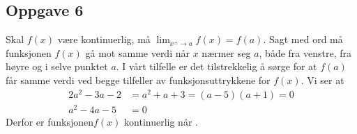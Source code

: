 \subsection*{Oppgave 6}
Skal $ f(x) $ være kontinuerlig, må $\lim_{x^\pm \to a} f(x) =f(a)$.
Sagt med ord må funksjonen $f(x)$ gå mot samme verdi når $x$ nærmer seg $a$, både fra venstre, fra høyre og i selve punktet $a$.
I vårt tilfelle er det tilstrekkelig å sørge for at $ f(a) $ får samme verdi ved begge tilfeller av funksjonsuttrykkene for $ f(x) $.
Vi ser at
\begin{align*}
	2a^2 - 3a - 2 &= a^2 +a + 3 = (a-5)(a+1)=0 \\
	a^2 -4a-5 &= 0
\end{align*}
Derfor er funksjonen$ f(x) $ kontinuerlig når .



